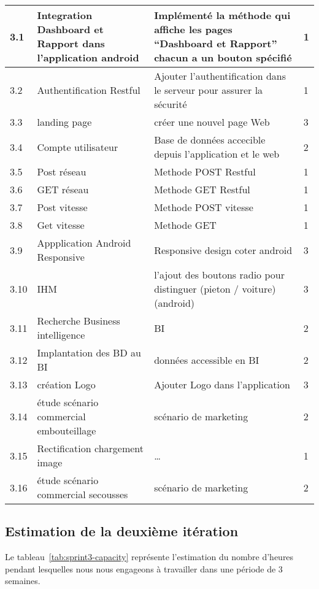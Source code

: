 \begin{center}
\begin{longtable}{| p{1cm} | p{5cm} | p{7cm} | p{1cm} |}
\hline
3.1 & Integration Dashboard et Rapport dans l'application android & Implémenté la méthode qui affiche les pages ``Dashboard et Rapport'' chacun a un bouton spécifié   & 1 \\ \hline
3.2 & Authentification Restful  & Ajouter l'authentification dans le serveur pour assurer la sécurité   & 1 \\ \hline
3.3 & landing page & créer une nouvel page Web  & 3\\ \hline
3.4 & Compte utilisateur & Base de données accecible depuis l'application et le web& 2 \\ \hline
3.5 & Post réseau & Methode POST Restful & 1 \\ \hline
3.6 & GET réseau & Methode GET Restful & 1 \\ \hline
3.7 & Post vitesse & Methode POST vitesse & 1 \\ \hline
3.8 & Get vitesse & Methode GET & 1 \\ \hline
3.9 & Appplication Android Responsive & Responsive design coter android & 3 \\ \hline
3.10 & IHM & l'ajout des boutons radio pour distinguer (pieton / voiture)(android) & 3 \\ \hline
3.11 & Recherche Business intelligence & BI & 2 \\ \hline
3.12 & Implantation des BD au BI & données accessible en BI & 2\\ \hline
3.13 & création Logo &Ajouter Logo dans l'application & 3 \\ \hline
3.14 & étude scénario commercial embouteillage & scénario de marketing& 2\\ \hline
3.15 & Rectification chargement image & \ldots & 1 \\ \hline
3.16 & étude scénario commercial secousses & scénario de marketing& 2\\ \hline
\end{longtable}
\end{center}

\subsection{Estimation de la deuxième itération}

Le tableau~\ref{tab:sprint3-capacity} représente l'estimation du nombre
d'heures pendant lesquelles nous nous engageons à travailler dans une période
de 3 semaines.

